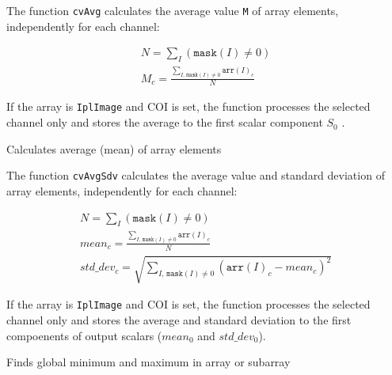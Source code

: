 The function \texttt{cvAvg} calculates the average value \texttt{M} of array elements, independently for each channel:

\[
\begin{array}{l}
N = \sum_I (\texttt{mask}(I) \ne 0)\\
M_c = \frac{\sum_{ I, \, \texttt{mask}(I) \ne 0} \texttt{arr}(I)_c}{N}
\end{array}
\]

If the array is \texttt{IplImage} and COI is set, the function processes the selected channel only and stores the average to the first scalar component $ S_0 $ .

\label{AvgSdv}

Calculates average (mean) of array elements


\begin{description}
\end{description}

The function \texttt{cvAvgSdv} calculates the average value and standard deviation of array elements, independently for each channel:

\[
\begin{array}{l}
N = \sum_I (\texttt{mask}(I) \ne 0)\\
mean_c = \frac{\sum_{ I, \, \texttt{mask}(I) \ne 0} \texttt{arr}(I)_c}{N}\\
std\_dev_c = \sqrt{\sum_{ I, \, \texttt{mask}(I) \ne 0} (\texttt{arr}(I)_c - mean_c)^2}
\end{array}
\]

If the array is \texttt{IplImage} and COI is set, the function processes the selected channel only and stores the average and standard deviation to the first compoenents of output scalars ($mean_0$ and $std\_dev_0$).

\label{MinMaxLoc}

Finds global minimum and maximum in array or subarray


